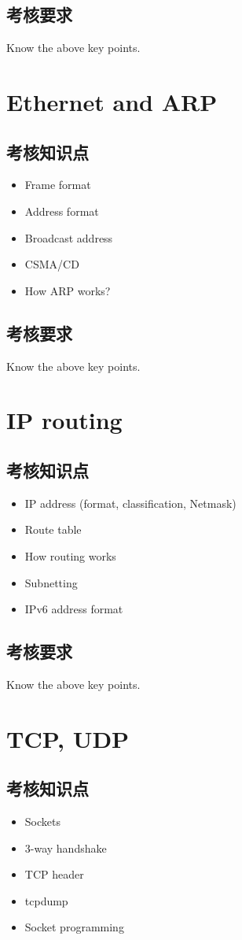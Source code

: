 \documentclass[11pt]{article}
\begin{document}
\subsection{考核要求}
\label{sec-1-2}
Know the above key points.
\section{Ethernet and ARP}
\label{sec-2}
\subsection{考核知识点}
\label{sec-2-1}
\begin{itemize}
\item Frame format
\item Address format
\item Broadcast address
\item CSMA/CD
\item How ARP works?
\end{itemize}
\subsection{考核要求}
\label{sec-2-2}
Know the above key points.
\section{IP routing}
\label{sec-3}
\subsection{考核知识点}
\label{sec-3-1}
\begin{itemize}
\item IP address (format, classification, Netmask)
\item Route table
\item How routing works
\item Subnetting
\item IPv6 address format
\end{itemize}
\subsection{考核要求}
\label{sec-3-2}
Know the above key points.
\section{TCP, UDP}
\label{sec-4}
\subsection{考核知识点}
\label{sec-4-1}
\begin{itemize}
\item Sockets
\item 3-way handshake
\item TCP header
\item tcpdump
\item Socket programming
\end{itemize}
\end{document}
